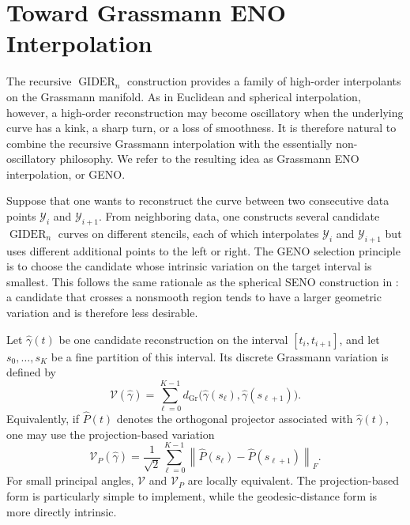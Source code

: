 \documentclass[a4paper,11pt]{article}
\DeclareMathOperator{\Gr}{Gr}
\newcommand{\norm}[1]{\left\lVert #1 \right\rVert}
\newcommand{\GIDER}{\operatorname{GIDER}}
\numberwithin{equation}{section}
\theoremstyle{plain}
\theoremstyle{definition}
\theoremstyle{remark}
\begin{document}
\section{Toward Grassmann ENO Interpolation}\label{sec:geno}

The recursive \(\GIDER_n\) construction provides a family of high-order interpolants on the Grassmann manifold.  As in Euclidean and spherical interpolation, however, a high-order reconstruction may become oscillatory when the underlying curve has a kink, a sharp turn, or a loss of smoothness.  It is therefore natural to combine the recursive Grassmann interpolation with the essentially non-oscillatory philosophy.  We refer to the resulting idea as Grassmann ENO interpolation, or GENO.

Suppose that one wants to reconstruct the curve between two consecutive data points \(\mathcal{Y}_i\) and \(\mathcal{Y}_{i+1}\).  From neighboring data, one constructs several candidate \(\GIDER_n\) curves on different stencils, each of which interpolates \(\mathcal{Y}_i\) and \(\mathcal{Y}_{i+1}\) but uses different additional points to the left or right.  The GENO selection principle is to choose the candidate whose intrinsic variation on the target interval is smallest.  This follows the same rationale as the spherical SENO construction in \cite{FongLeung2023}: a candidate that crosses a nonsmooth region tends to have a larger geometric variation and is therefore less desirable.

Let \(\widehat\gamma(t)\) be one candidate reconstruction on the interval \([t_i,t_{i+1}]\), and let \(s_0,\ldots,s_K\) be a fine partition of this interval.  Its discrete Grassmann variation is defined by
\[
    \mathcal{V}(\widehat\gamma)
    =
    \sum_{\ell=0}^{K-1}
    d_{\Gr}\bigl(
        \widehat\gamma(s_\ell),
        \widehat\gamma(s_{\ell+1})
    \bigr).
\]
Equivalently, if \(\widehat P(t)\) denotes the orthogonal projector associated with \(\widehat\gamma(t)\), one may use the projection-based variation
\[
    \mathcal{V}_P(\widehat\gamma)
    =
    \frac{1}{\sqrt{2}}
    \sum_{\ell=0}^{K-1}
    \norm{
        \widehat P(s_\ell)
        -
        \widehat P(s_{\ell+1})
    }_F.
\]
For small principal angles, \(\mathcal{V}\) and \(\mathcal{V}_P\) are locally equivalent.  The projection-based form is particularly simple to implement, while the geodesic-distance form is more directly intrinsic.
\end{document}
